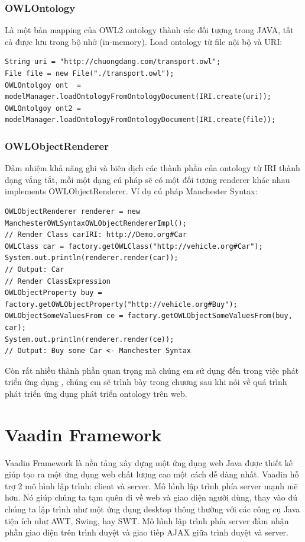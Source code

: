 \subsubsection{OWLOntology}
Là một bản mapping của OWL2 ontology thành các đối tượng trong JAVA, tất cả được lưu trong bộ nhớ (in-memory). Load ontology từ file nội bộ và URI:
\begin{verbatim}
String uri = "http://chuongdang.com/transport.owl";
File file = new File("./transport.owl");
OWLOntolgoy ont  = modelManager.loadOntologyFromOntologyDocument(IRI.create(uri));
OWLOntolgoy ont2 = modelManager.loadOntologyFromOntologyDocument(IRI.create(file));
\end{verbatim}
\subsubsection{OWLObjectRenderer}
Đảm nhiệm khả năng ghi và biên dịch các thành phần của ontology từ IRI thành dạng vắng tắt, mỗi một dạng cú pháp sẽ có một đối tượng renderer khác nhau implements OWLObjectRenderer. Ví dụ cú pháp Manchester Syntax:
\begin{verbatim}
OWLObjectRenderer renderer = new ManchesterOWLSyntaxOWLObjectRendererImpl();
// Render Class carIRI: http://Demo.org#Car
OWLClass car = factory.getOWLClass("http://vehicle.org#Car");
System.out.println(renderer.render(car));
// Output: Car
// Render ClassExpression
OWLObjectProperty buy = factory.getOWLObjectProperty("http://vehicle.org#Buy");
OWLObjectSomeValuesFrom ce = factory.getOWLObjectSomeValuesFrom(buy, car);
System.out.println(renderer.render(ce));
// Output: Buy some Car <- Manchester Syntax
\end{verbatim}
Còn rất nhiều thành phần quan trọng mà chúng em sử dụng đến trong việc phát triển ứng dụng , chúng em sẽ trình bày trong chương sau khi nói về quá trình phát triển ứng dụng phát triển ontology trên web.

\section{Vaadin Framework }
Vaadin Framework là nền tảng xây dựng một ứng dụng web Java được thiết kế giúp tạo ra một ứng dụng web chất lượng cao một cách dễ dàng nhất. Vaadin hỗ trợ 2 mô hình lập trình: client và server. Mô hình lập trình phía server mạnh mẽ hơn. Nó giúp chúng ta tạm quên đi về web và giao diện người dùng, thay vào đú chúng ta lập trình như một ứng dụng desktop thông thường với các công cụ Java tiện ích như AWT, Swing, hay SWT. Mô hình lập trình phía server đảm nhận phần giao diện trên trình duyệt và giao tiếp AJAX giữa trình duyệt và server.
